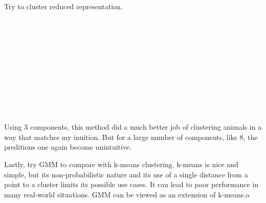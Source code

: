 \documentclass{article} %
\begin{document}
Try to cluster reduced representation.

    \begin{center}
    \end{center}
    { \hspace*{\fill} \\}

    \begin{center}
    \end{center}
    { \hspace*{\fill} \\}

    \begin{center}
    \end{center}
    { \hspace*{\fill} \\}

    \begin{center}
    \end{center}
    { \hspace*{\fill} \\}

    \begin{center}
    \end{center}
    { \hspace*{\fill} \\}

    \begin{center}
    \end{center}
    { \hspace*{\fill} \\}

Using 3 components, this method did a much better job of clustering animals in a way that matches my inuition. 
But for a large number of components, like 8, the preditions one again become unintuitive.

Lastly, try GMM to compare with k-means clustering.
k-means is nice and simple, but its non-probabilistic nature and its use of a single distance from a point to a cluster limits its possible use cases. 
It can lead to poor performance in many real-world situations.
GMM can be viewed as an extension of k-means.o
\end{document}

